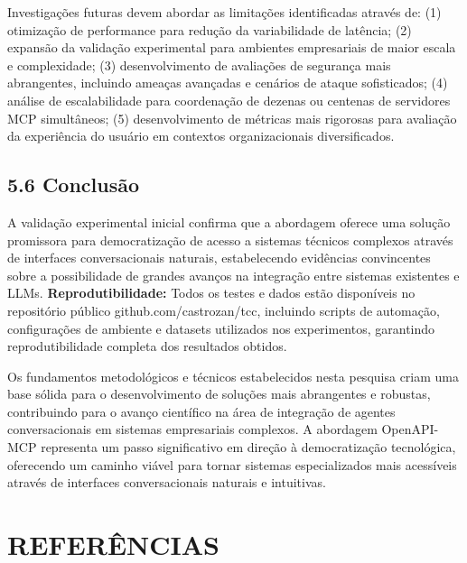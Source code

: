 \documentclass[
]{article}
\begin{document}
Investigações futuras devem abordar as limitações identificadas através
de: (1) otimização de performance para redução da variabilidade de
latência; (2) expansão da validação experimental para ambientes
empresariais de maior escala e complexidade; (3) desenvolvimento de
avaliações de segurança mais abrangentes, incluindo ameaças avançadas e
cenários de ataque sofisticados; (4) análise de escalabilidade para
coordenação de dezenas ou centenas de servidores MCP simultâneos; (5)
desenvolvimento de métricas mais rigorosas para avaliação da experiência
do usuário em contextos organizacionais diversificados.

\subsection{5.6 Conclusão}\label{conclusuxe3o}

A validação experimental inicial confirma que a abordagem oferece uma
solução promissora para democratização de acesso a sistemas técnicos
complexos através de interfaces conversacionais naturais, estabelecendo
evidências convincentes sobre a possibilidade de grandes avanços na
integração entre sistemas existentes e LLMs. \textbf{Reprodutibilidade:}
Todos os testes e dados estão disponíveis no repositório público
github.com/castrozan/tcc, incluindo scripts de automação, configurações
de ambiente e datasets utilizados nos experimentos, garantindo
reprodutibilidade completa dos resultados obtidos.

Os fundamentos metodológicos e técnicos estabelecidos nesta pesquisa
criam uma base sólida para o desenvolvimento de soluções mais
abrangentes e robustas, contribuindo para o avanço científico na área de
integração de agentes conversacionais em sistemas empresariais
complexos. A abordagem OpenAPI-MCP representa um passo significativo em
direção à democratização tecnológica, oferecendo um caminho viável para
tornar sistemas especializados mais acessíveis através de interfaces
conversacionais naturais e intuitivas.

\section*{REFERÊNCIAS}\label{referuxeancias}
\end{document}
